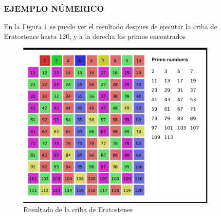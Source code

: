 \subsubsection{EJEMPLO NÚMERICO}
    En la Figura \ref{eratostenes} se puede ver el resultado despues de ejecutar la criba de Eratostenes hasta 120, y a la derecha los primos encontrados
    \begin{figure}[H]
        \centering
        \includegraphics[width=10cm]{images/eratostenes_ejemplo.png}
        \caption{Resultado de la criba de Eratostenes}
        \label{eratostenes}
    \end{figure}



